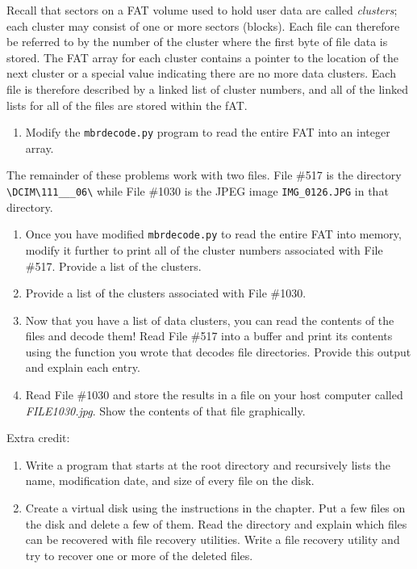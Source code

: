 \noindent   Recall that sectors on a FAT volume used to hold user data are
  called \emph{clusters};  each cluster may consist of one or
  more sectors (blocks). Each file can therefore be referred to by the
  number of the cluster where the first byte of file data is
  stored. The FAT array for each cluster contains a pointer to the
  location of the next cluster or a special value indicating there are
  no more data clusters. Each file is therefore described by a linked
  list of cluster numbers, and all of the linked lists for all of the
  files are stored within the fAT.

\begin{enumerate}[resume]
\item Modify the \texttt{mbrdecode.py} program to read the
  entire FAT into an integer array. 
\end{enumerate}
  
\noindent  The remainder of these problems work with two
  files. File \#517 is the
  directory \verb|\DCIM\111___06\| while File \#1030 is the JPEG image
  \verb|IMG_0126.JPG| in that directory.

\begin{enumerate}[resume]
\item  Once you have modified \texttt{mbrdecode.py} to read the entire FAT
  into memory, modify it further to print all of the cluster numbers 
  associated with File \#517. Provide a list of the clusters.

\item Provide a list of the clusters associated with File \#1030.

\item Now that you have a list of data clusters, you can read the
  contents of the files and decode them!  Read File \#517 into a
  buffer and print its contents using the function you wrote that
  decodes file directories. Provide this output and explain each entry.

\item Read File \#1030 and store the results in a file on your host
  computer called \emph{FILE1030.jpg}. Show the contents of that file graphically.

\end{enumerate}
  
\noindent Extra credit:


\begin{enumerate}[resume]
\item Write a program that starts at the root
  directory and recursively lists the name, modification date, and
  size of every file on the disk.
\item Create a virtual disk using the instructions in the chapter. Put
  a few files on the disk and delete a few of them. Read the directory
  and explain which files can be recovered with file recovery
  utilities. Write a file recovery utility and try to recover one or
  more of the deleted files.
\end{enumerate}



